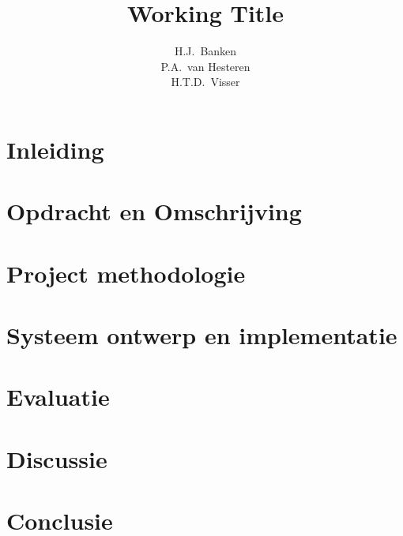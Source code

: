 \documentclass[dutch]{tudelft-report}
\begin{document}
\frontmatter

\title[Bachelorproject]{Working Title}
\author{H.J.\ Banken \\ P.A.\ van Hesteren \\ H.T.D.\ Visser}
\makecover





\tableofcontents



\mainmatter

\chapter{Inleiding} \label{ch:inleiding} 

\chapter{Opdracht en Omschrijving} \label{ch:opdracht-en-omschrijving} 

\chapter{Project methodologie} \label{ch:project-methodologie} 

\chapter{Systeem ontwerp en implementatie} \label{ch:systeem-ontwerp-en-implementatie} 

\chapter{Evaluatie} \label{ch:evaluatie} 

\chapter{Discussie} \label{ch:discussie} 

\chapter{Conclusie} \label{ch:conclusie} 
\end{document}

